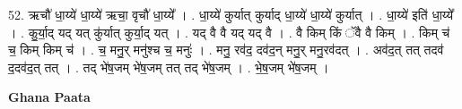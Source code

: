\documentclass[17pt]{extarticle}
\begin{document}
52. ऋचौ॑ धा॒य्ये॑ धा॒य्ये॑ ऋचा॒ वृचौ॑ धा॒य्ये᳚ । . धा॒य्ये॑ कुर्यात् कुर्याद् धा॒य्ये॑ धा॒य्ये॑ कुर्यात् । . धा॒य्ये॑ इति॑ धा॒य्ये᳚ । . कु॒र्या॒द् यद् यत् कु॑र्यात् कुर्या॒द् यत् । . यद् वै वै यद् यद् वै । . वै किम् किं ॅवै वै किम् । . किम् च॑ च॒ किम् किम् च॑ । . च॒ मनु॒र् मनु॑श्च च॒ मनुः॑ । . मनु॒ रव॑द॒ दव॑द॒न् मनु॒र् मनु॒रव॑दत् । . अव॑द॒त् तत् तदव॑ द॒दव॑द॒त् तत् । . तद् भे॑ष॒जम् भे॑ष॒जम् तत् तद् भे॑ष॒जम् । . भे॒ष॒जम् भे॑ष॒जम् । \newline

\textbf{Ghana Paata } \newline
\end{document}
